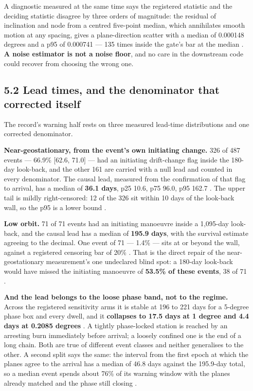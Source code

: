 \documentclass[11pt]{article}
\begin{document}
A diagnostic measured at the same time says the registered statistic and the deciding statistic disagree by three orders of magnitude: the residual of inclination and node from a centred five-point median, which annihilates smooth motion at any spacing, gives a plane-direction scatter with a median of 0.000148 degrees and a p95 of 0.000741 --- 135 times inside the gate's bar at the median%
. \textbf{A noise estimator is not a noise floor}, and no care in the downstream code could recover from choosing the wrong one.

\subsection*{5.2 Lead times, and the denominator that corrected itself}

The record's warning half rests on three measured lead-time distributions and one corrected denominator.

\textbf{Near-geostationary, from the event's own initiating change.} 326 of 487 events --- 66.9\% [62.6, 71.0] --- had an initiating drift-change flag inside the 180-day look-back, and the other 161 are carried with a null lead and counted in every denominator. The causal lead, measured from the confirmation of that flag to arrival, has a median of \textbf{36.1 days}, p25 10.6, p75 96.0, p95 162.7%
. The upper tail is mildly right-censored: 12 of the 326 sit within 10 days of the look-back wall, so the p95 is a lower bound%
.

\textbf{Low orbit.} 71 of 71 events had an initiating manoeuvre inside a 1,095-day look-back, and the causal lead has a median of \textbf{195.9 days}, with the survival estimate agreeing to the decimal. One event of 71 --- 1.4\% --- sits at or beyond the wall, against a registered censoring bar of 20\%%
. That is the direct repair of the near-geostationary measurement's one undeclared blind spot: a 180-day look-back would have missed the initiating manoeuvre of \textbf{53.5\% of these events}, 38 of 71%
.

\textbf{And the lead belongs to the loose phase band, not to the regime.} Across the registered sensitivity arms it is stable at 196 to 221 days for a 5-degree phase box and every dwell, and it \textbf{collapses to 17.5 days at 1 degree and 4.4 days at 0.2085 degrees}%
. A tightly phase-locked station is reached by an arresting burn immediately before arrival; a loosely confined one is the end of a long chain. Both are true of different event classes and neither generalises to the other. A second split says the same: the interval from the first epoch at which the planes agree to the arrival has a median of 46.8 days against the 195.9-day total, so a median event spends about 76\% of its warning window with the planes already matched and the phase still closing%
.
\end{document}
